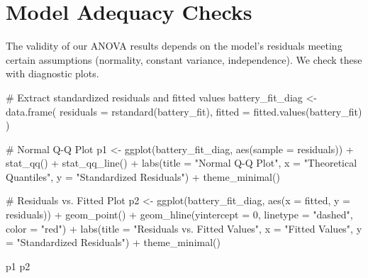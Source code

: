 \documentclass[
  letterpaper,
  DIV=11,
  numbers=noendperiod]{scrreprt}
\newenvironment{Shaded}{\begin{snugshade}}{\end{snugshade}}
\newcommand{\AttributeTok}[1]{\textcolor[rgb]{0.40,0.45,0.13}{#1}}
\newcommand{\CommentTok}[1]{\textcolor[rgb]{0.37,0.37,0.37}{#1}}
\newcommand{\DecValTok}[1]{\textcolor[rgb]{0.68,0.00,0.00}{#1}}
\newcommand{\FunctionTok}[1]{\textcolor[rgb]{0.28,0.35,0.67}{#1}}
\newcommand{\NormalTok}[1]{\textcolor[rgb]{0.00,0.23,0.31}{#1}}
\newcommand{\OtherTok}[1]{\textcolor[rgb]{0.00,0.23,0.31}{#1}}
\newcommand{\SpecialCharTok}[1]{\textcolor[rgb]{0.37,0.37,0.37}{#1}}
\newcommand{\StringTok}[1]{\textcolor[rgb]{0.13,0.47,0.30}{#1}}
\begin{document}
\section{Model Adequacy Checks}\label{model-adequacy-checks-1}

The validity of our ANOVA results depends on the model's residuals
meeting certain assumptions (normality, constant variance,
independence). We check these with diagnostic plots.

\begin{Shaded}
\begin{Highlighting}[]
\CommentTok{\# Extract standardized residuals and fitted values}
\NormalTok{battery\_fit\_diag }\OtherTok{\textless{}{-}} \FunctionTok{data.frame}\NormalTok{(}
  \AttributeTok{residuals =} \FunctionTok{rstandard}\NormalTok{(battery\_fit),}
  \AttributeTok{fitted =} \FunctionTok{fitted.values}\NormalTok{(battery\_fit)}
\NormalTok{)}

\CommentTok{\# Normal Q{-}Q Plot}
\NormalTok{p1 }\OtherTok{\textless{}{-}} \FunctionTok{ggplot}\NormalTok{(battery\_fit\_diag, }\FunctionTok{aes}\NormalTok{(}\AttributeTok{sample =}\NormalTok{ residuals)) }\SpecialCharTok{+}
  \FunctionTok{stat\_qq}\NormalTok{() }\SpecialCharTok{+}
  \FunctionTok{stat\_qq\_line}\NormalTok{() }\SpecialCharTok{+}
  \FunctionTok{labs}\NormalTok{(}\AttributeTok{title =} \StringTok{"Normal Q{-}Q Plot"}\NormalTok{, }\AttributeTok{x =} \StringTok{"Theoretical Quantiles"}\NormalTok{, }\AttributeTok{y =} \StringTok{"Standardized Residuals"}\NormalTok{) }\SpecialCharTok{+}
  \FunctionTok{theme\_minimal}\NormalTok{()}

\CommentTok{\# Residuals vs. Fitted Plot}
\NormalTok{p2 }\OtherTok{\textless{}{-}} \FunctionTok{ggplot}\NormalTok{(battery\_fit\_diag, }\FunctionTok{aes}\NormalTok{(}\AttributeTok{x =}\NormalTok{ fitted, }\AttributeTok{y =}\NormalTok{ residuals)) }\SpecialCharTok{+}
  \FunctionTok{geom\_point}\NormalTok{() }\SpecialCharTok{+}
  \FunctionTok{geom\_hline}\NormalTok{(}\AttributeTok{yintercept =} \DecValTok{0}\NormalTok{, }\AttributeTok{linetype =} \StringTok{"dashed"}\NormalTok{, }\AttributeTok{color =} \StringTok{"red"}\NormalTok{) }\SpecialCharTok{+}
  \FunctionTok{labs}\NormalTok{(}\AttributeTok{title =} \StringTok{"Residuals vs. Fitted Values"}\NormalTok{, }\AttributeTok{x =} \StringTok{"Fitted Values"}\NormalTok{, }\AttributeTok{y =} \StringTok{"Standardized Residuals"}\NormalTok{) }\SpecialCharTok{+}
  \FunctionTok{theme\_minimal}\NormalTok{()}

\NormalTok{p1 }
\NormalTok{p2}
\end{Highlighting}
\end{Shaded}
\end{document}
